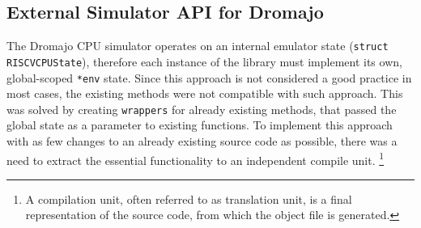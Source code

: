 \pagebreak

\subsection{External Simulator API for Dromajo}

The Dromajo CPU simulator operates on an internal emulator state (\texttt{struct RISCVCPUState}), therefore each
instance of the library must implement its own, global-scoped \texttt{*env} state. Since this approach is not considered
a good practice in most cases, the existing methods were not compatible with such approach. This was solved by
creating \texttt{wrappers} for already existing methods, that passed the global state as a parameter to existing
functions. To implement this approach with as few changes to an already existing source code as possible, there was a need to
extract the essential functionality to an independent compile unit.%
\footnote{A compilation unit, often referred to as translation unit, is a final representation of the source code,
from which the object file is generated.}

